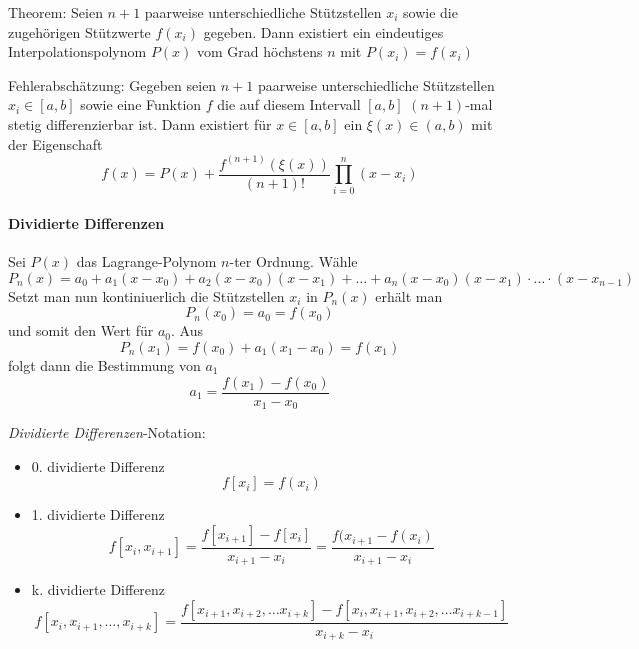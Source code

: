 Theorem: Seien $n + 1$ paarweise unterschiedliche Stützstellen $x_i$ sowie die zugehörigen Stützwerte $f(x_i)$ gegeben. Dann existiert ein eindeutiges Interpolationspolynom $P(x)$ vom Grad höchstens $n$ mit $P(x_i) = f(x_i)$

Fehlerabschätzung: Gegeben seien $n + 1$ paarweise unterschiedliche Stützstellen $x_i \in [a, b]$ sowie eine Funktion $f$ die auf diesem Intervall $[a, b]$ $(n + 1)$-mal stetig differenzierbar ist. Dann existiert für $x \in [a, b]$ ein $\xi(x) \in (a, b)$ mit der Eigenschaft
\begin{equation}
	f(x) = P(x) + \frac{f^{(n + 1)}(\xi(x))}{(n + 1)!} \prod_{i = 0}^{n} (x - x_i)
\end{equation}

\paragraph{Dividierte Differenzen} Sei $P(x)$ das Lagrange-Polynom $n$-ter Ordnung. Wähle
\begin{equation}
	P_n(x) = a_0 + a_1(x - x_0) + a_2(x - x_0)(x - x_1) + \ldots + a_n(x - x_0)(x - x_1) \cdot \ldots \cdot (x - x_{n-1})
\end{equation}
Setzt man nun kontiniuerlich die Stützstellen $x_i$ in $P_n(x)$ erhält man
\begin{equation}
	P_n(x_0) = a_0 = f(x_0)
\end{equation}
und somit den Wert für $a_0$. Aus
\begin{equation}
	P_n(x_1) = f(x_0) + a_1(x_1 - x_0) = f(x_1)
\end{equation}
folgt dann die Bestimmung von $a_1$
\begin{equation}
	a_1 = \frac{f(x_1) - f(x_0)}{x_1 - x_0}
\end{equation}

\textit{Dividierte Differenzen}-Notation:
\begin{itemize}
	\item 0. dividierte Differenz
	\begin{equation}
		f[x_i] = f(x_i)
	\end{equation}
	\item 1. dividierte Differenz
	\begin{equation}
		f[x_i, x_{i + 1}] = \frac{f[x_{i + 1}] - f[x_i]}{x_{i + 1} - x_i} = \frac{f(x_{i + 1} - f(x_i)}{x_{i + 1} - x_i}
	\end{equation}
	\item k. dividierte Differenz
	\begin{equation}
		f[x_i, x_{i + 1}, \ldots, x_{i + k}] = \frac{f[x_{i + 1}, x_{i + 2}, \ldots x_{i + k}] - f[x_i, x_{i + 1}, x_{i + 2}, \ldots x_{i + k - 1}]}{x_{i + k} - x_i}
	\end{equation}
\end{itemize}

